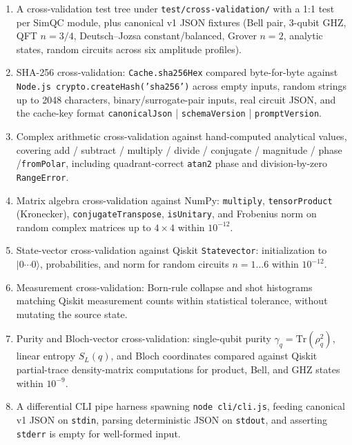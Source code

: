 \documentclass[conference]{IEEEtran}
\begin{document}
\begin{enumerate}
    \item A cross-validation test tree under \texttt{test/cross-validation/} with a 1:1 test per SimQC module, plus canonical v1 JSON fixtures (Bell pair, 3-qubit GHZ, QFT $n=3/4$, Deutsch--Jozsa constant/balanced, Grover $n=2$, analytic states, random circuits across six amplitude profiles).

    \item SHA-256 cross-validation: \texttt{Cache.sha256Hex} compared byte-for-byte against \texttt{Node.js crypto.createHash('sha256')} across empty inputs, random strings up to 2048 characters, binary/surrogate-pair inputs, real circuit JSON, and the cache-key format \texttt{canonicalJson} | \texttt{schemaVersion} | \texttt{promptVersion}.

    \item Complex arithmetic cross-validation against hand-computed analytical values, covering add / subtract / multiply / divide / conjugate / magnitude / phase /\texttt{fromPolar}, including quadrant-correct \texttt{atan2} phase and division-by-zero \texttt{RangeError}.

    \item Matrix algebra cross-validation against NumPy: \texttt{multiply}, \texttt{tensorProduct} (Kronecker), \texttt{conjugateTranspose}, \texttt{isUnitary}, and Frobenius norm on random complex matrices up to $4\times4$ within $10^{-12}$.

    \item State-vector cross-validation against Qiskit \texttt{Statevector}: initialization to $\lvert 0\cdots 0\rangle$, probabilities, and norm for random circuits $n=1\ldots6$ within $10^{-12}$.

    \item Measurement cross-validation: Born-rule collapse and shot histograms matching Qiskit measurement counts within statistical tolerance, without mutating the source state.

    \item Purity and Bloch-vector cross-validation: single-qubit purity $\gamma_q = \mathrm{Tr}(\rho_q^2)$, linear entropy $S_L(q)$, and Bloch coordinates compared against Qiskit partial-trace density-matrix computations for product, Bell, and GHZ states within $10^{-9}$.

    \item A differential CLI pipe harness spawning \texttt{node cli/cli.js}, feeding canonical v1 JSON on \texttt{stdin}, parsing deterministic JSON on \texttt{stdout}, and asserting \texttt{stderr} is empty for well-formed input.


\end{enumerate}
\end{document}

